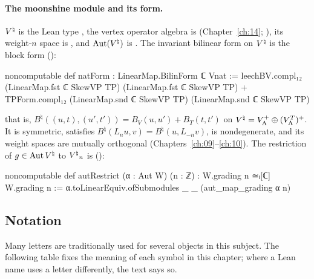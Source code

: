 \paragraph{The moonshine module and its form.}  ${V^{\natural}}$ is the Lean type , the vertex
operator algebra is  (Chapter~\ref{ch:14}; ), its
weight-$n$ space is , and $\operatorname{Aut}({V^{\natural}})$ is .  The
invariant bilinear form on ${V^{\natural}}$ is the block form 
():
\begin{leancode}
noncomputable def natForm : LinearMap.BilinForm ℂ Vnat :=
  leechBV.compl₁₂ (LinearMap.fst ℂ SkewVP TP) (LinearMap.fst ℂ SkewVP TP)
    + TPForm.compl₁₂ (LinearMap.snd ℂ SkewVP TP) (LinearMap.snd ℂ SkewVP TP)
\end{leancode}
that is, $B^\natural((u,t),(u',t'))=B_V(u,u')+B_T(t,t')$ on ${V^{\natural}}=V_{\Lambda}^+\oplus(V_{\Lambda}^T)^+$.  It is
symmetric, satisfies $B^\natural(L_nu,v)=B^\natural(u,L_{-n}v)$, is nondegenerate, and its weight
spaces are mutually orthogonal (Chapters~\ref{ch:09}--\ref{ch:10}).  The restriction of $g\in\operatorname{Aut}{V^{\natural}}$
to ${V^{\natural}}_n$ is  ():
\begin{leancode}
noncomputable def autRestrict (α : Aut W) (n : ℤ) : W.grading n ≃ₗ[ℂ] W.grading n :=
  α.toLinearEquiv.ofSubmodules _ _ (aut_map_grading α n)
\end{leancode}

\subsection{Notation}\label{ch18:sec:notation}

Many letters are traditionally used for several objects in this subject.  The following table fixes the meaning of
each symbol in this chapter; where a Lean name uses a letter differently, the text says so.

